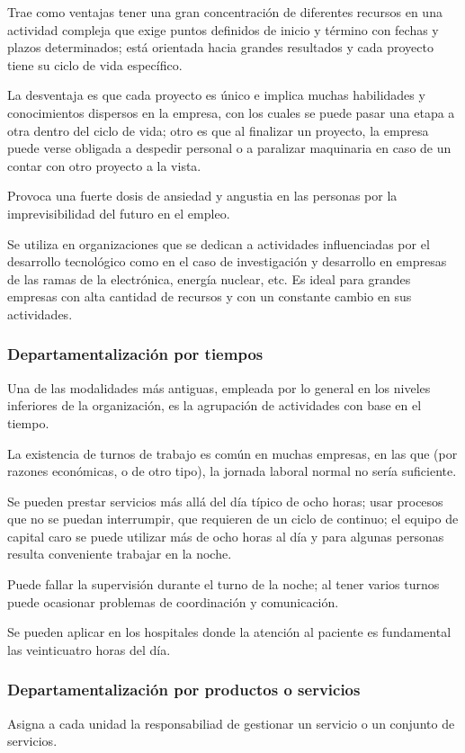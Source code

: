 Trae como ventajas tener una gran concentración de diferentes recursos en una actividad compleja que exige puntos definidos de inicio y término con fechas y plazos determinados; está orientada hacia grandes resultados y cada proyecto tiene su ciclo de vida específico.

La desventaja es que cada proyecto es único e implica muchas habilidades y conocimientos dispersos en la empresa, con los cuales se puede pasar una etapa a otra dentro del ciclo de vida; otro es que al finalizar un proyecto, la empresa puede verse obligada a despedir personal o a paralizar maquinaria en caso de un contar con otro proyecto a la vista.

Provoca una fuerte dosis de ansiedad y angustia en las personas por la imprevisibilidad del futuro en el empleo.

Se utiliza en organizaciones que se dedican a actividades influenciadas por el desarrollo tecnológico como en el caso de investigación y desarrollo en empresas de las ramas de la electrónica, energía nuclear, etc. Es ideal para grandes empresas con alta cantidad de recursos y con un constante cambio en sus actividades.

\subsubsection{Departamentalización por tiempos}
Una de las modalidades más antiguas, empleada por lo general en los niveles inferiores de la organización, es la agrupación de actividades con base en el tiempo.

La existencia de turnos de trabajo es común en muchas empresas, en las que (por razones económicas, o de otro tipo), la jornada laboral normal no sería suficiente. 

Se pueden prestar servicios más allá del día típico de ocho horas; usar procesos que no se puedan interrumpir, que requieren de un ciclo de continuo; el equipo de capital caro se puede utilizar más de ocho horas al día y para algunas personas resulta conveniente trabajar en la noche.

Puede fallar la supervisión durante el turno de la noche; al tener varios turnos puede ocasionar problemas de coordinación y comunicación.

Se pueden aplicar en los hospitales donde la atención al paciente es fundamental las veinticuatro horas del día.

\subsubsection{Departamentalización por productos o servicios}
Asigna a cada unidad la responsabiliad de gestionar un servicio o un conjunto de servicios.

